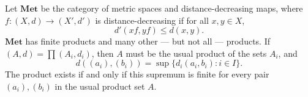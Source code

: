 Let $\mathbf{Met}$ be the category of metric spaces and distance-decreasing maps, where $f: (X, d) \to (X', d')$ is distance-decreasing if for all $x, y \in X$,
$$d'(xf, yf) \leq d(x, y).$$
$\mathbf{Met}$ has finite products and many other --- but not all --- products. If $(A, d) = \prod (A_i, d_i)$, then $A$ must be the usual product of the sets $A_i$, and
$$d((a_i), (b_i)) = \sup\{d_i(a_i, b_i) : i \in I\}.$$
The product exists if and only if this supremum is finite for every pair $(a_i), (b_i)$ in the usual product set $A$.
